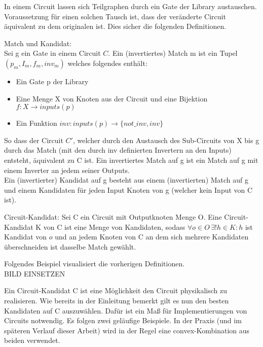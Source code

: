 \documentclass[11pt, a4paper, german]{article}
\begin{document}
In einem Circuit lassen sich Teilgraphen durch ein Gate der Library austauschen. Voraussetzung für einen solchen Tausch ist, dass der veränderte Circuit äquivalent zu dem originalen ist. Dies sicher die folgenden Definitionen. 

\begin{definition}{Match und Kandidat:}\\
Sei g ein Gate in einem Circuit $C$. Ein (invertiertes) Match m ist ein Tupel $(p_m, I_m, f_m, inv_m)$ welches folgendes enthält:
\begin{itemize}
\item Ein Gate p der Library
\item Eine Menge X von Knoten aus der Circuit und eine Bijektion $ f: X \rightarrow inputs(p)$
\item Ein Funktion $ inv : inputs(p) \rightarrow \{not\_inv , inv \}$
\end{itemize}
So dass der Circuit $C'$, welcher durch den Austausch des Sub-Circuits von X bis g durch das Match (mit den durch inv definierten Invertern an den Inputs) entsteht, äquivalent zu C ist.
Ein invertiertes Match auf g ist ein Match auf g mit einem Inverter an jedem seiner Outputs.\\
Ein (invertierter) Kandidat auf g besteht aus einem (invertierten) Match auf g und einem Kandidaten für jeden Input Knoten von g (welcher kein Input von C ist).
\end{definition}

\begin{definition}{Circuit-Kandidat:}
Sei C ein Circuit mit Outputknoten Menge O. Eine Circuit-Kandidat K von C ist eine Menge von Kandidaten, sodass $\forall o \in O \, \exists!  h  \in K : h$ ist Kandidat von $ o$ und an jedem Knoten von C an dem sich mehrere Kandidaten überschneiden ist dasselbe Match gewählt.
\end{definition}
Folgendes Beispiel visualisiert die vorherigen Definitionen.\\
BILD EINSETZEN

Ein Circuit-Kandidat C ist eine Möglichkeit den Circuit physikalisch zu realisieren. Wie bereits in der Einleitung bemerkt gilt es nun den besten Kandidaten auf C auszuwählen. Dafür ist ein Maß für Implementierungen von Circuits notwendig. Es folgen zwei geläufige Beispiele. In der Praxis (und im späteren Verlauf dieser Arbeit) wird in der Regel eine convex-Kombination aus beiden verwendet.
\end{document}
